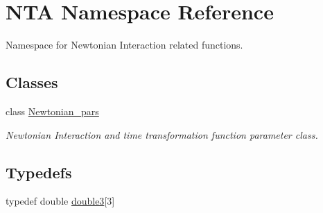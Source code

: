 \hypertarget{namespaceNTA}{}\section{N\+TA Namespace Reference}
\label{namespaceNTA}


Namespace for Newtonian Interaction related functions.  


\subsection*{Classes}
\begin{DoxyCompactItemize}
\item 
class \hyperlink{classNTA_1_1Newtonian__pars}{Newtonian\+\_\+pars}
\begin{DoxyCompactList}\small\item\em Newtonian Interaction and time transformation function parameter class. \end{DoxyCompactList}\end{DoxyCompactItemize}
\subsection*{Typedefs}
\begin{DoxyCompactItemize}
\item 
typedef double \hyperlink{namespaceNTA_a19ccaac066849b26305dbbbee129fa0e}{double3}\mbox{[}3\mbox{]}
\end{DoxyCompactItemize}
